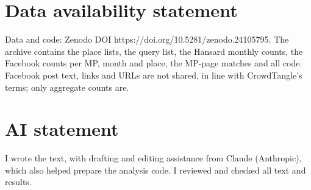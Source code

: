 \documentclass[11pt,a4paper]{article}
\begin{document}
\section*{Data availability statement}
Data and code: Zenodo DOI https://doi.org/10.5281/zenodo.24105795. The archive contains the place lists, the query list, the Hansard monthly counts, the Facebook counts per MP, month and place, the MP-page matches and all code. Facebook post text, links and URLs are not shared, in line with CrowdTangle's terms; only aggregate counts are.

\section*{AI statement}
I wrote the text, with drafting and editing assistance from Claude (Anthropic), which also helped prepare the analysis code. I reviewed and checked all text and results.
\end{document}
